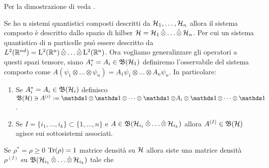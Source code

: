 Per la dimostrazione di veda \cite{Hall}.

Se ho n sistemi quantistici composti descritti da $\operatorname{\mathcal{H}}_1, \dots, \operatorname{\mathcal{H}}_n$ allora il sistema composto è descritto dallo spazio di hilber $\operatorname{\mathcal{H}} = \operatorname{\mathcal{H}}_1 \operatorname{\hat{\otimes}} \dots \operatorname{\hat{\otimes}} \operatorname{\mathcal{H}}_n$. 
Per cui un sistema quantistico di n particelle puó essere descritto da $L^2(\mathbb{R}^{nd})= \operatorname{L^2(\mathbb{R}^n)} \operatorname{\hat{\otimes}} \dots \operatorname{\hat{\otimes}} \operatorname{L^2(\mathbb{R}^n)}$. Ora vogliamo generalizzare gli operatori a questi spazi tensore, 
siano $A_i^* = A_i\in \mathfrak{B}(\operatorname{\mathcal{H}}_1)$ definiremo l'osservabile del sistema composto come $A(\psi_1 \otimes \dots \otimes \psi_n)= A_1 \psi_1 \otimes \dots \otimes A_n \psi_n$.
In particolare:
\begin{enumerate}
    \item Se $A_i^* = A_i\in \mathfrak{B}(\operatorname{\mathcal{H}}_i)$ definisco $\B \ni A^{ (i)} := \un \otimes \un \otimes \dots \otimes \un \otimes A_i \otimes \un \otimes \dots \otimes \un$.
    \item Se $I = \{ i_1, \dots , i_k \} \subset \{1, \dots , n \}$ e $A \in \mathfrak{B}(\operatorname{\mathcal{H}}_{i_1}\operatorname{\hat{\otimes}} \dots \operatorname{\hat{\otimes}} \operatorname{\mathcal{H}}_{i_k})$ allora $A^{ (I)} \in \operatorname{\mathfrak{B}(\mathcal{H})}$ agisce sui sottosistemi associati.
\end{enumerate}

\begin{theorem}
    Se $\rho^* = \rho \geq 0$ $\Tr(\rho) = 1$ matrice densità su $\operatorname{\mathcal{H}}$ allora siste una matrice densità $\rho^(I)$ su $\mathfrak{B}(\operatorname{\mathcal{H}}_{i_1}\operatorname{\hat{\otimes}} \dots \operatorname{\hat{\otimes}} \operatorname{\mathcal{H}}_{i_k})$ tale che 
\end{theorem}

